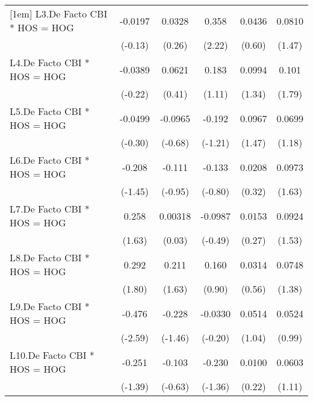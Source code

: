 {\begin{longtable}{l*{5}{c}}
[1em]
L3.De Facto CBI * HOS = HOG&  -0.0197         &   0.0328         &    0.358\sym{*}  &   0.0436         &   0.0810         \\
                &  (-0.13)         &   (0.26)         &   (2.22)         &   (0.60)         &   (1.47)         \\
[1em]
L4.De Facto CBI * HOS = HOG&  -0.0389         &   0.0621         &    0.183         &   0.0994         &    0.101         \\
                &  (-0.22)         &   (0.41)         &   (1.11)         &   (1.34)         &   (1.79)         \\
[1em]
L5.De Facto CBI * HOS = HOG&  -0.0499         &  -0.0965         &   -0.192         &   0.0967         &   0.0699         \\
                &  (-0.30)         &  (-0.68)         &  (-1.21)         &   (1.47)         &   (1.18)         \\
[1em]
L6.De Facto CBI * HOS = HOG&   -0.208         &   -0.111         &   -0.133         &   0.0208         &   0.0973         \\
                &  (-1.45)         &  (-0.95)         &  (-0.80)         &   (0.32)         &   (1.63)         \\
[1em]
L7.De Facto CBI * HOS = HOG&    0.258         &  0.00318         &  -0.0987         &   0.0153         &   0.0924         \\
                &   (1.63)         &   (0.03)         &  (-0.49)         &   (0.27)         &   (1.53)         \\
[1em]
L8.De Facto CBI * HOS = HOG&    0.292         &    0.211         &    0.160         &   0.0314         &   0.0748         \\
                &   (1.80)         &   (1.63)         &   (0.90)         &   (0.56)         &   (1.38)         \\
[1em]
L9.De Facto CBI * HOS = HOG&   -0.476\sym{*}  &   -0.228         &  -0.0330         &   0.0514         &   0.0524         \\
                &  (-2.59)         &  (-1.46)         &  (-0.20)         &   (1.04)         &   (0.99)         \\
[1em]
L10.De Facto CBI * HOS = HOG&   -0.251         &   -0.103         &   -0.230         &   0.0100         &   0.0603         \\
                &  (-1.39)         &  (-0.63)         &  (-1.36)         &   (0.22)         &   (1.11)         \\

\end{longtable}}
